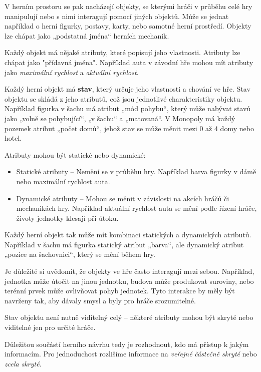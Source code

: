 V herním prostoru se pak nacházejí objekty, se kterými hráči v průběhu celé hry manipulují nebo s nimi interagují pomocí jiných objektů. Může se jednat například o herní figurky, postavy, karty, nebo samotné herní prostředí. Objekty lze chápat jako „podstatná jména“ herních mechanik. 

Každý objekt má nějaké atributy, které popisují jeho vlastnosti. Atributy lze chápat jako "přídavná jména". Například auta v závodní hře mohou mít atributy jako \textit{maximální rychlost} a \textit{aktuální rychlost}. 

Každý herní objekt má \textbf{stav}, který určuje jeho vlastnosti a chování ve hře. Stav objektu se skládá z jeho atributů, což jsou jednotlivé charakteristiky objektu. Například figurka v šachu má atribut „mód pohybu“, který může nabývat stavů jako „volně se pohybující“, „v šachu“ a „matovaná“. V Monopoly má každý pozemek atribut „počet domů“, jehož stav se může měnit mezi 0 až 4 domy nebo hotel.

Atributy mohou být statické nebo dynamické:

\begin{itemize} \item Statické atributy – Nemění se v průběhu hry. Například barva figurky v dámě nebo maximální rychlost auta.
\item Dynamické atributy – Mohou se měnit v závislosti na akcích hráčů či mechanikách hry. Například aktuální rychlost auta se mění podle řízení hráče, životy jednotky klesají při útoku. \end{itemize}

Každý herní objekt tak může mít kombinaci statických a dynamických atributů. Například v šachu má figurka statický atribut „barva“, ale dynamický atribut „pozice na šachovnici“, který se mění během hry.

Je důležité si uvědomit, že objekty ve hře často interagují mezi sebou. Například, jednotka může útočit na jinou jednotku, budova může produkovat suroviny, nebo terénní prvek může ovlivňovat pohyb jednotek. Tyto interakce by měly být navrženy tak, aby dávaly smysl a byly pro hráče srozumitelné.

Stav objektu není nutně viditelný celý – některé atributy mohou být skryté nebo viditelné jen pro určité hráče.

Důležitou součástí herního návrhu tedy je rozhodnout, kdo má přístup k jakým informacím. Pro jednoduchost rozlišíme informace na \textit{veřejné} \textit{částečně skryté} nebo \textit{zcela skryté}. 


